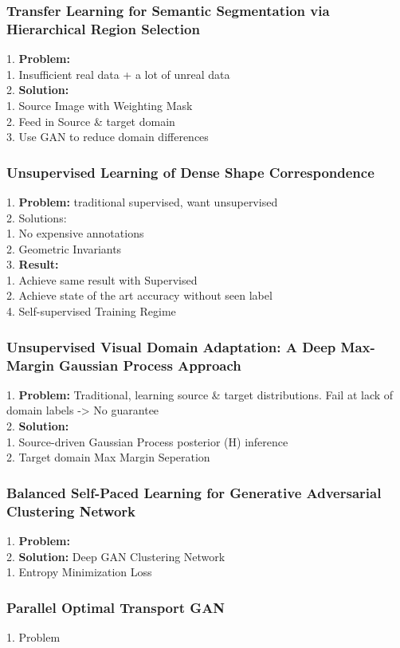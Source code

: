\subsubsection{Transfer Learning for Semantic Segmentation via Hierarchical Region Selection}
    1. {\bf Problem:} \\
        1. Insufficient real data + a lot of unreal data \\
    2. {\bf Solution:} \\
        1. Source Image with Weighting Mask \\
        2. Feed in Source \& target domain \\
        3. Use GAN to reduce domain differences \\
\subsubsection{Unsupervised Learning of Dense Shape Correspondence}
    1. {\bf Problem:} traditional supervised, want unsupervised \\
    2. Solutions: \\
        1. No expensive annotations \\
        2. Geometric Invariants \\
    3. {\bf Result:} \\
        1. Achieve same result with Supervised \\
        2. Achieve state of the art accuracy without seen label \\
    4. Self-supervised Training Regime \\
\subsubsection{Unsupervised Visual Domain Adaptation: A Deep Max-Margin Gaussian Process Approach}
    1. {\bf Problem:} Traditional, learning source \& target distributions. Fail at lack of domain labels -> No guarantee \\
    2. {\bf Solution:} \\
        1. Source-driven Gaussian Process posterior (H) inference \\
        2. Target domain Max Margin Seperation \\
\subsubsection{Balanced Self-Paced Learning for Generative Adversarial Clustering Network}
    1. {\bf Problem:}  \\
    2. {\bf Solution:} Deep GAN Clustering Network \\
        1. Entropy Minimization Loss \\
\subsubsection{Parallel Optimal Transport GAN}
    1. Problem
